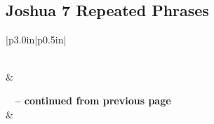 \subsection{Joshua 7 Repeated Phrases}


\normalsize
 
\begin{center}
\begin{longtable}{|p{3.0in}|p{0.5in}|}
\caption[Joshua 7 Repeated Phrases]{Joshua 7 Repeated Phrases}\label{table:Repeated Phrases Joshua 7} \\
\hline {} &  \\ \hline 
\endfirsthead
 
{{\bfseries \tablename\ \thetable{} -- continued from previous page}} \\  
\hline {} &  \\ \hline 
\endhead
 

\end{longtable}
\end{center}
